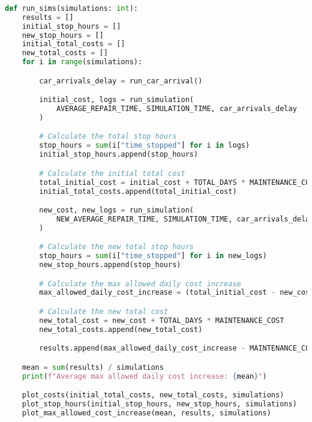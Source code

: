 \begin{enumerate}
    \begin{lstlisting}[language=Python, caption=Visualización de Resultados,label={lst:lstlisting7}]
        
def run_sims(simulations: int):
    results = []
    initial_stop_hours = []
    new_stop_hours = []
    initial_total_costs = []
    new_total_costs = []
    for i in range(simulations):

        car_arrivals_delay = run_car_arrival()

        initial_cost, logs = run_simulation(
            AVERAGE_REPAIR_TIME, SIMULATION_TIME, car_arrivals_delay
        )

        # Calculate the total stop hours
        stop_hours = sum(i["time_stopped"] for i in logs)
        initial_stop_hours.append(stop_hours)

        # Calculate the initial total cost
        total_initial_cost = initial_cost + TOTAL_DAYS * MAINTENANCE_COST
        initial_total_costs.append(total_initial_cost)

        new_cost, new_logs = run_simulation(
            NEW_AVERAGE_REPAIR_TIME, SIMULATION_TIME, car_arrivals_delay
        )

        # Calculate the new total stop hours
        stop_hours = sum(i["time_stopped"] for i in new_logs)
        new_stop_hours.append(stop_hours)

        # Calculate the max allowed daily cost increase
        max_allowed_daily_cost_increase = (total_initial_cost - new_cost) / TOTAL_DAYS

        # Calculate the new total cost
        new_total_cost = new_cost + TOTAL_DAYS * MAINTENANCE_COST
        new_total_costs.append(new_total_cost)

        results.append(max_allowed_daily_cost_increase - MAINTENANCE_COST)

    mean = sum(results) / simulations
    print(f"Average max allowed daily cost increase: {mean}")

    plot_costs(initial_total_costs, new_total_costs, simulations)
    plot_stop_hours(initial_stop_hours, new_stop_hours, simulations)
    plot_max_allowed_cost_increase(mean, results, simulations)


    \end{lstlisting}
\end{enumerate}
